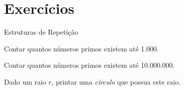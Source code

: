 
\section{Exercícios}

\begin{slide}{Estruturas de Repetição}

    \item Contar quantos números primos existem até 1.000.
    
    \item Contar quantos números primos existem até 10.000.000.

    \item Dado um raio $r$, printar uma \textit{círculo} que possua este raio.

\end{slide}